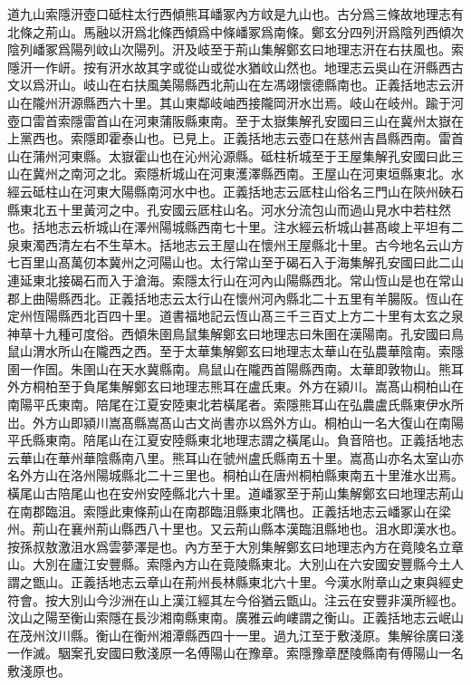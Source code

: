 道九山索隱汧壺口砥柱太行西傾熊耳嶓冢內方㞶是九山也。古分爲三條故地理志有北條之荊山。馬融以汧爲北條西傾爲中條嶓冢爲南條。鄭玄分四列汧爲陰列西傾次陰列嶓冢爲陽列㞶山次陽列。汧及岐至于荊山集解鄭玄曰地理志汧在右扶風也。索隱汧一作岍。按有汧水故其字或從山或從水猶㞶山然也。地理志云吳山在汧縣西古文以爲汧山。岐山在右扶風美陽縣西北荊山在左馮翊懷德縣南也。正義括地志云汧山在隴州汧源縣西六十里。其山東鄰岐岫西接隴岡汧水岀焉。岐山在岐州。踰于河壺口雷首索隱雷首山在河東蒲阪縣東南。至于太嶽集解孔安國曰三山在冀州太嶽在上黨西也。索隱即霍泰山也。已見上。正義括地志云壺口在慈州吉昌縣西南。雷首山在蒲州河東縣。太嶽霍山也在沁州沁源縣。砥柱析城至于王屋集解孔安國曰此三山在冀州之南河之北。索隱析城山在河東濩澤縣西南。王屋山在河東垣縣東北。水經云砥柱山在河東大陽縣南河水中也。正義括地志云厎柱山俗名三門山在陝州硤石縣東北五十里黃河之中。孔安國云厎柱山名。河水分流包山而過山見水中若柱然也。括地志云析城山在澤州陽城縣西南七十里。注水經云析城山甚髙峻上平坦有二泉東濁西清左右不生草木。括地志云王屋山在懷州王屋縣北十里。古今地名云山方七百里山髙萬仞本冀州之河陽山也。太行常山至于碣石入于海集解孔安國曰此二山連延東北接碣石而入于滄海。索隱太行山在河內山陽縣西北。常山恆山是也在常山郡上曲陽縣西北。正義括地志云太行山在懷州河內縣北二十五里有羊腸阪。恆山在定州恆陽縣西北百四十里。道書福地記云恆山髙三千三百丈上方二十里有太玄之泉神草十九種可度俗。西傾朱圉鳥鼠集解鄭玄曰地理志曰朱圉在漢陽南。孔安國曰鳥鼠山渭水所山在隴西之西。至于太華集解鄭玄曰地理志太華山在弘農華陰南。索隱圉一作圄。朱圉山在天水冀縣南。鳥鼠山在隴西首陽縣西南。太華即敦物山。熊耳外方桐柏至于負尾集解鄭玄曰地理志熊耳在盧氏東。外方在潁川。嵩髙山桐柏山在南陽平氏東南。陪尾在江夏安陸東北若橫尾者。索隱熊耳山在弘農盧氏縣東伊水所岀。外方山即潁川嵩髙縣嵩髙山古文尚書亦以爲外方山。桐柏山一名大復山在南陽平氏縣東南。陪尾山在江夏安陸縣東北地理志謂之橫尾山。負音陪也。正義括地志云華山在華州華陰縣南八里。熊耳山在虢州盧氏縣南五十里。嵩髙山亦名太室山亦名外方山在洛州陽城縣北二十三里也。桐柏山在唐州桐柏縣東南五十里淮水岀焉。橫尾山古陪尾山也在安州安陸縣北六十里。道嶓冢至于荊山集解鄭玄曰地理志荊山在南郡臨沮。索隱此東條荊山在南郡臨沮縣東北隅也。正義括地志云嶓冢山在梁州。荊山在襄州荊山縣西八十里也。又云荊山縣本漢臨沮縣地也。沮水即漢水也。按孫叔敖激沮水爲雲夢澤是也。內方至于大別集解鄭玄曰地理志內方在竟陵名立章山。大別在廬江安豐縣。索隱內方山在竟陵縣東北。大別山在六安國安豐縣今土人謂之甑山。正義括地志云章山在荊州長林縣東北六十里。今漢水附章山之東與經史符會。按大別山今沙洲在山上漢江經其左今俗猶云甑山。注云在安豐非漢所經也。汶山之陽至衡山索隱在長沙湘南縣東南。廣雅云岣嶁謂之衡山。正義括地志云岷山在茂州汶川縣。衡山在衡州湘潭縣西四十一里。過九江至于敷淺原。集解徐廣曰淺一作滅。駰案孔安國曰敷淺原一名傅陽山在豫章。索隱豫章歷陵縣南有傅陽山一名敷淺原也。

